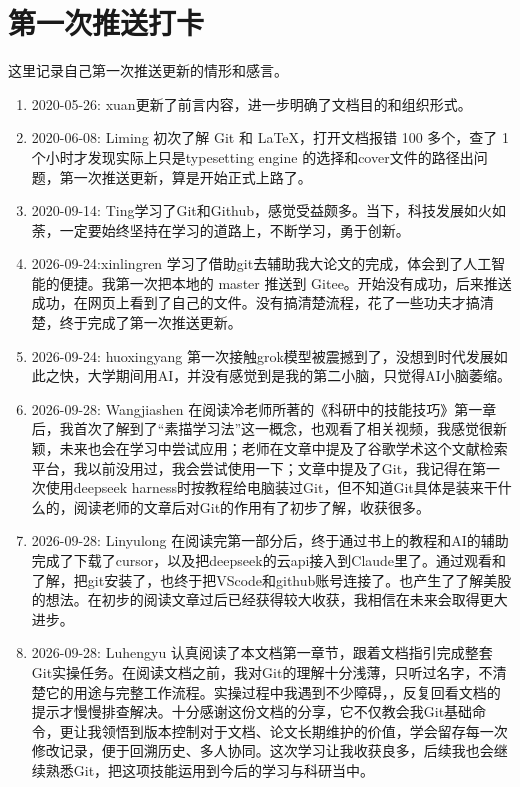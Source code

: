 \documentclass[cn,11pt,chinese,twoside]{elegantbook}
\begin{document}
\section*{第一次推送打卡}
这里记录自己第一次推送更新的情形和感言。
\begin{enumerate}
\item 2020-05-26: xuan更新了前言内容，进一步明确了文档目的和组织形式。
\item 2020-06-08: Liming 初次了解 Git 和 \LaTeX{}，打开文档报错 100 多个，查了 1 个小时才发现实际上只是typesetting engine 的选择和cover文件的路径出问题，第一次推送更新，算是开始正式上路了。
\item 2020-09-14: Ting学习了Git和Github，感觉受益颇多。当下，科技发展如火如荼，一定要始终坚持在学习的道路上，不断学习，勇于创新。
\item 2026-09-24:xinlingren 学习了借助git去辅助我大论文的完成，体会到了人工智能的便捷。我第一次把本地的 master 推送到 Gitee。开始没有成功，后来推送成功，在网页上看到了自己的文件。没有搞清楚流程，花了一些功夫才搞清楚，终于完成了第一次推送更新。

\item 2026-09-24: huoxingyang 第一次接触grok模型被震撼到了，没想到时代发展如此之快，大学期间用AI，并没有感觉到是我的第二小脑，只觉得AI小脑萎缩。

\item 2026-09-28: Wangjiashen 在阅读冷老师所著的《科研中的技能技巧》第一章后，我首次了解到了“素描学习法”这一概念，也观看了相关视频，我感觉很新颖，未来也会在学习中尝试应用；老师在文章中提及了谷歌学术这个文献检索平台，我以前没用过，我会尝试使用一下；文章中提及了Git，我记得在第一次使用deepseek harness时按教程给电脑装过Git，但不知道Git具体是装来干什么的，阅读老师的文章后对Git的作用有了初步了解，收获很多。
\item 2026-09-28: Linyulong 在阅读完第一部分后，终于通过书上的教程和AI的辅助完成了下载了cursor，以及把deepseek的云api接入到Claude里了。通过观看和了解，把git安装了，也终于把VScode和github账号连接了。也产生了了解美股的想法。在初步的阅读文章过后已经获得较大收获，我相信在未来会取得更大进步。
\item 2026-09-28: Luhengyu 认真阅读了本文档第一章节，跟着文档指引完成整套Git实操任务。在阅读文档之前，我对Git的理解十分浅薄，只听过名字，不清楚它的用途与完整工作流程。实操过程中我遇到不少障碍，，反复回看文档的提示才慢慢排查解决。十分感谢这份文档的分享，它不仅教会我Git基础命令，更让我领悟到版本控制对于文档、论文长期维护的价值，学会留存每一次修改记录，便于回溯历史、多人协同。这次学习让我收获良多，后续我也会继续熟悉Git，把这项技能运用到今后的学习与科研当中。


\end{enumerate}
\end{document}
